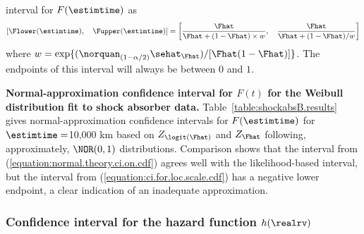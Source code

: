 interval for $F(\estimtime)$ as
\begin{equation}
\label{equation:normal.theory.ci.on.cdf}
	  [ \Flower(\estimtime), \quad	\Fupper(\estimtime) ] = 
	\left[\frac{\Fhat}{\Fhat
	+(1-\Fhat) \times w}, \quad \frac{\Fhat}{\Fhat+
	(1-\Fhat)/w}\right]
\end{equation}
where
$w=\exp\{(\norquan_{(1-\alpha/2)}
	\sehat_{\Fhat})/[\Fhat(1-\Fhat)]\}$.
The endpoints of this interval will always be between $0$ and $1$.
\begin{example}
{\bf Normal-approximation confidence interval for $F(t)$ for the Weibull
 distribution fit to shock absorber data.} 
Table~\ref{table:shockabsB.results} gives
normal-approximation confidence intervals for $F(\estimtime)$ for
$\estimtime=$10,000 km based on $Z_{\logit(\Fhat)}$ and
$Z_{\Fhat}$ following, approximately, $\NOR(0,1)$
distributions.  Comparison shows that the interval
from (\ref{equation:normal.theory.ci.on.cdf}) agrees well
with the likelihood-based interval, but the
interval from (\ref{equation:ci.for.loc.scale.cdf})
has a negative lower endpoint, a clear indication
of an inadequate approximation.
\end{example}
\subsubsection{Confidence interval 
for the hazard function $h(\realrv)$}
\label{section:locscale.hazard.normal}

